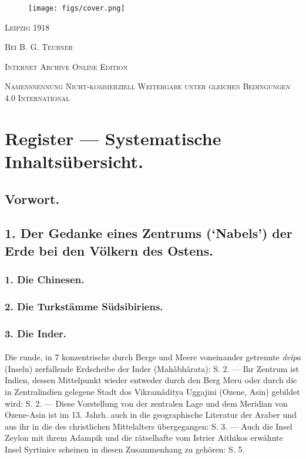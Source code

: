 \documentclass[a4paper, 11pt, oneside]{article}
\begin{document}
\begin{titlepage}
        \begin{figure}[H]
        \centering
        \texttt{[image: figs/cover.png]}
        \end{figure}

	\vspace{1\baselineskip}

        \vspace*{\fill}

	{\small\scshape Leipzig 1918}
	
	{\small\scshape{Bei B. G. Teubner}}
 
	\vspace{0.5\baselineskip} %

        \scshape Internet Archive Online Edition  %
	
	{\scshape\small Namensnennung Nicht-kommerziell Weitergabe unter gleichen Bedingungen 4.0 International} %
\end{titlepage}
\setlength{\parskip}{1mm plus1mm minus1mm}
\clearpage
\tableofcontents
\clearpage
\section*{Register --- Systematische Inhaltsübersicht.}
\subsection*{Vorwort.}
\subsection*{1. Der Gedanke eines Zentrums (`Nabels') der Erde bei den Völkern des Ostens.}
\subsubsection*{1. Die Chinesen.}
\subsubsection*{2. Die Turkstämme Südsibiriens.}
\subsubsection*{3. Die Inder.}
\paragraph{}
Die runde, in 7 konzentrische durch Berge und Meere voneinander getrennte \emph{dvîpa} (Inseln) zerfallende Erdscheibe der Inder (Mahâbhârata): S. 2. --- Ihr Zentrum ist Indien, dessen Mittelpunkt wieder entweder durch den Berg Meru oder durch die in Zentralindien gelegene Stadt dos Vikramâditya Uggajini (Ozene, Asin) gebildet wird: S. 2. --- Diese Vorstellung von der zentralen Lage und dem Meridian von Ozene-Asin ist im 13. Jahrh. auch in die geographische Literatur der Araber und aus ihr in die des christlichen Mittelalters übergegangen: S. 3. --- Auch die Insel Zeylon mit ihrem Adampik und die rätselhafte vom Istrier Aithikos erwähnte Insel Syrtinice scheinen in diesen Zusammenhang zu gehören: S. 5.
\end{document}
